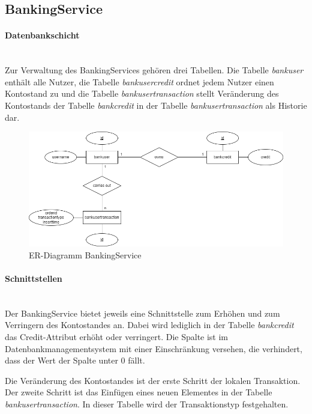 \subsection{BankingService}
\paragraph*{Datenbankschicht} \mbox{}\\
Zur Verwaltung des BankingServices gehören drei Tabellen. Die Tabelle \textit{bankuser} enthält alle Nutzer, die Tabelle \textit{bankusercredit} ordnet jedem Nutzer einen Kontostand zu und die Tabelle \textit{bankusertransaction} stellt Veränderung des Kontostands der Tabelle \textit{bankcredit} in der Tabelle \textit{bankusertransaction} als Historie dar.

\begin{figure}[h!]
	\centering
	\includegraphics[scale=0.5]{figures/DatabaseER/BankingServiceTables.png}
	\caption{ER-Diagramm BankingService}
\end{figure}
\FloatBarrier

\paragraph*{Schnittstellen} \mbox{}\\
Der BankingService bietet jeweils eine Schnittstelle zum Erhöhen und zum Verringern des Kontostandes an. Dabei wird lediglich in der Tabelle \textit{bankcredit} das Credit-Attribut erhöht oder verringert. Die Spalte ist im Datenbankmanagementsystem mit einer Einschränkung versehen, die verhindert, dass der Wert der Spalte unter 0 fällt. 

Die Veränderung des Kontostandes ist der erste Schritt der lokalen Transaktion. Der zweite Schritt ist das Einfügen eines neuen Elementes in der Tabelle \textit{bankusertransaction}. In dieser Tabelle wird der Transaktionstyp festgehalten. 

